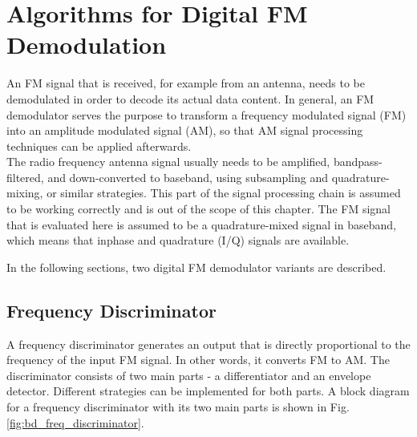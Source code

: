 \section{Algorithms for Digital FM Demodulation}
\label{sec:algorithms-for-digital-fm-demodulation}

An FM signal that is received, for example from an antenna, needs to be demodulated in order to decode its actual data content.
In general, an FM demodulator serves the purpose to transform a frequency modulated signal (FM) into an amplitude modulated signal (AM), so that AM signal processing techniques can be applied afterwards.\\

The radio frequency antenna signal usually needs to be amplified, bandpass-filtered, and down-converted to baseband, using subsampling and quadrature-mixing, or similar strategies.
This part of the signal processing chain is assumed to be working correctly and is out of the scope of this chapter. %
The FM signal that is evaluated here is assumed to be a quadrature-mixed signal in baseband, which means that inphase and quadrature (I/Q) signals are available.


In the following sections, two digital FM demodulator variants are described.


\subsection{Frequency Discriminator}

A frequency discriminator generates an output that is directly proportional to the frequency of the input FM signal.
In other words, it converts FM to AM.
The discriminator consists of two main parts - a differentiator and an envelope detector.
Different strategies can be implemented for both parts.
A block diagram for a frequency discriminator with its two main parts is shown in Fig.\ref{fig:bd_freq_discriminator}.

